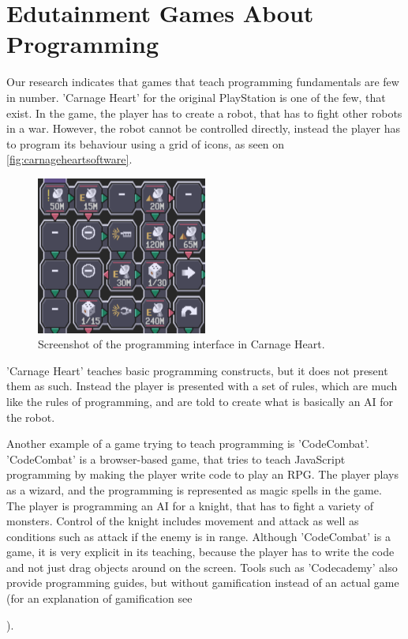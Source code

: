 \section{Edutainment Games About Programming}
\label{sec:teachProgWithGames}
Our research indicates that games that teach programming fundamentals are few in number. 'Carnage Heart' for the original PlayStation is one of the few, that exist. In the game, the player has to create a robot, that has to fight other robots in a war. However, the robot cannot be controlled directly, instead the player has to program its behaviour using a grid of icons, as seen on \autoref{fig:carnageheartsoftware}.

\begin{figure}[ht]
  \centering
    \includegraphics[width=0.5\textwidth]{img/CarnageHeartSoftware.png}
  \caption{Screenshot of the programming interface in Carnage Heart.\cite{carnageheartsoftware}}
  \label{fig:carnageheartsoftware}
\end{figure}

'Carnage Heart' teaches basic programming constructs, but it does not present them as such. Instead the player is presented with a set of rules, which are much like the rules of programming, and are told to create what is basically an AI for the robot.\newline

Another example of a game trying to teach programming is 'CodeCombat'. \cite{codecombat} 'CodeCombat' is a browser-based game, that tries to teach JavaScript programming by making the player write code to play an RPG. The player plays as a wizard, and the programming is represented as magic spells in the game. The player is programming an AI for a knight, that has to fight a variety of monsters. Control of the knight includes movement and attack as well as conditions such as attack if the enemy is in range.
Although 'CodeCombat' is a game, it is very explicit in its teaching, because the player has to write the code and not just drag objects around on the screen. Tools such as 'Codecademy' also provide programming guides, but without gamification instead of an actual game (for an explanation of gamification see \author{sec:gamification}).\cite{codecademy}\newline

